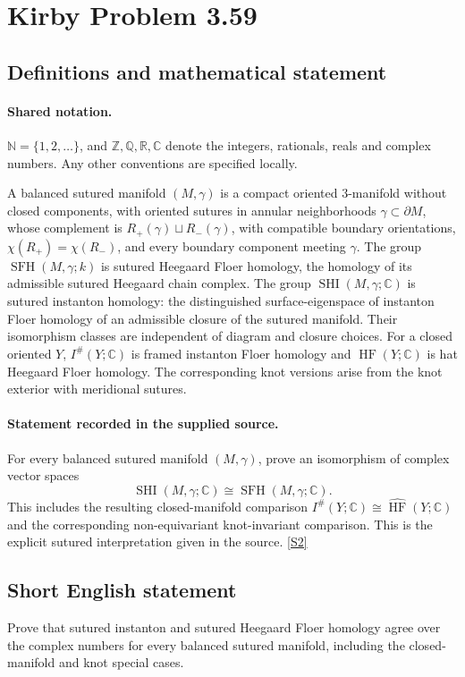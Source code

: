 \documentclass[11pt]{article}
\newcommand{\sref}[2]{\hyperlink{source:#1:#2}{[S#2]}}
\begin{document}
\section{Kirby Problem 3.59}\label{statement}

\subsection{Definitions and mathematical statement}

\paragraph{Shared notation.}$\mathbb N=\{1,2,\ldots\}$, and $\mathbb Z,\mathbb Q,\mathbb R,\mathbb C$ denote the integers, rationals, reals and complex numbers. Any other conventions are specified locally.


A balanced sutured manifold $(M,\gamma)$ is a compact oriented $3$-manifold without closed components, with oriented sutures in annular neighborhoods $\gamma\subset\partial M$, whose complement is $R_+(\gamma)\sqcup R_-(\gamma)$, with compatible boundary orientations, $\chi(R_+)=\chi(R_-)$, and every boundary component meeting $\gamma$. The group $\operatorname{SFH}(M,\gamma;k)$ is sutured Heegaard Floer homology, the homology of its admissible sutured Heegaard chain complex. The group $\operatorname{SHI}(M,\gamma;\mathbb C)$ is sutured instanton homology: the distinguished surface-eigenspace of instanton Floer homology of an admissible closure of the sutured manifold. Their isomorphism classes are independent of diagram and closure choices. For a closed oriented $Y$, $I^\#(Y;\mathbb C)$ is framed instanton Floer homology and $\widehat{\operatorname{HF}}(Y;\mathbb C)$ is hat Heegaard Floer homology. The corresponding knot versions arise from the knot exterior with meridional sutures.
\paragraph{Statement recorded in the supplied source.}
For every balanced sutured manifold $(M,\gamma)$, prove an isomorphism of complex vector spaces
\[
\operatorname{SHI}(M,\gamma;\mathbb C)\cong\operatorname{SFH}(M,\gamma;\mathbb C).
\]
This includes the resulting closed-manifold comparison $I^\#(Y;\mathbb C)\cong\widehat{\operatorname{HF}}(Y;\mathbb C)$ and the corresponding non-equivariant knot-invariant comparison. This is the explicit sutured interpretation given in the source. \sref{statement}{2}
\subsection{Short English statement}
Prove that sutured instanton and sutured Heegaard Floer homology agree over the complex numbers for every balanced sutured manifold, including the closed-manifold and knot special cases.
\end{document}
